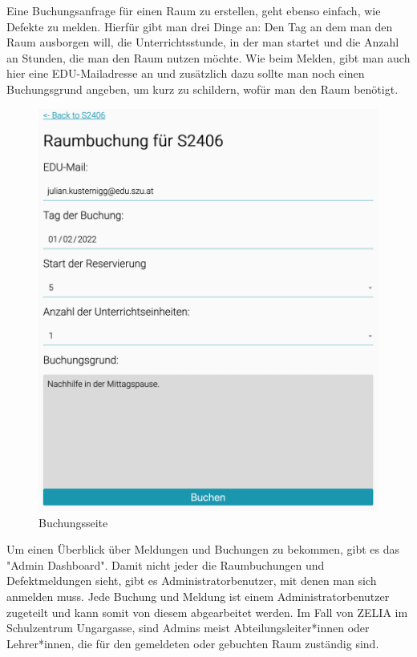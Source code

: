 Eine Buchungsanfrage für einen Raum zu erstellen, geht ebenso einfach, wie Defekte zu melden. Hierfür gibt man drei Dinge an: Den Tag an dem man den Raum ausborgen will, die Unterrichtsstunde, in der man startet und die Anzahl an Stunden, die man den Raum nutzen möchte. Wie beim Melden, gibt man auch hier eine EDU-Mailadresse an und zusätzlich dazu sollte man noch einen Buchungsgrund angeben, um kurz zu schildern, wofür man den Raum benötigt.

\begin{figure}[H]
    \centering
    \includegraphics[width=120mm]{media/WebComponents/Buchungsseite_light.png}
    \caption{Buchungsseite}
\end{figure}


\label{sec:webcomplogdash}

Um einen Überblick über Meldungen und Buchungen zu bekommen, gibt es das "Admin Dashboard". Damit nicht jeder die Raumbuchungen und Defektmeldungen sieht, gibt es Administratorbenutzer, mit denen man sich anmelden muss. Jede Buchung und Meldung ist einem Administratorbenutzer zugeteilt und kann somit von diesem abgearbeitet werden. Im Fall von ZELIA im Schulzentrum Ungargasse, sind Admins meist Abteilungsleiter*innen oder Lehrer*innen, die für den gemeldeten oder gebuchten Raum zuständig sind. 

